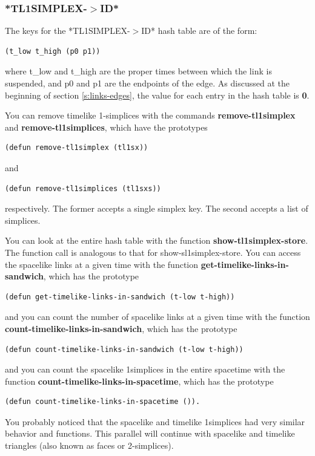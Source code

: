 \documentclass[12pt]{article}
\begin{document}
\subsubsection{*TL1SIMPLEX-$>$ID*}
\label{sss:tl1simplex:id}

The keys for the *TL1SIMPLEX-$>$ID* hash table are of the form:
\begin{lstlisting}
(t_low t_high (p0 p1))
\end{lstlisting}
where t\_low and t\_high are the proper times between which the link
is suspended, and p0 and p1 are the endpoints of the edge. As
discussed at the beginning of section \ref{s:links-edges}, the value
for each entry in the hash table is \textbf{0}.

You can remove timelike 1-simplices with the commands
\textbf{remove-tl1simplex} and \textbf{remove-tl1simplices}, which
have the prototypes
\begin{lstlisting}
(defun remove-tl1simplex (tl1sx))
\end{lstlisting}
and 
\begin{lstlisting}
(defun remove-tl1simplices (tl1sxs))
\end{lstlisting}
respectively. The former accepts a single simplex key. The second
accepts a list of simplices.

You can look at the entire hash table with the function
\textbf{show-tl1simplex-store}. The function call is analogous to that
for show-sl1simplex-store. You can access the spacelike links at a
given time with the function \textbf{get-timelike-links-in-sandwich},
which has the prototype
\begin{lstlisting}
(defun get-timelike-links-in-sandwich (t-low t-high))
\end{lstlisting}
and you can count the number of spacelike links at a given time with
the function \textbf{count-timelike-links-in-sandwich}, which has the
prototype
\begin{lstlisting}
(defun count-timelike-links-in-sandwich (t-low t-high))
\end{lstlisting}
and you can count the spacelike 1simplices in the entire spacetime
with the function \textbf{count-timelike-links-in-spacetime}, which
has the prototype
\begin{lstlisting}
(defun count-timelike-links-in-spacetime ()).
\end{lstlisting}

You probably noticed that the spacelike and timelike 1simplices had
very similar behavior and functions. This parallel will continue with
spacelike and timelike triangles (also known as faces or 2-simplices).
\end{document}
